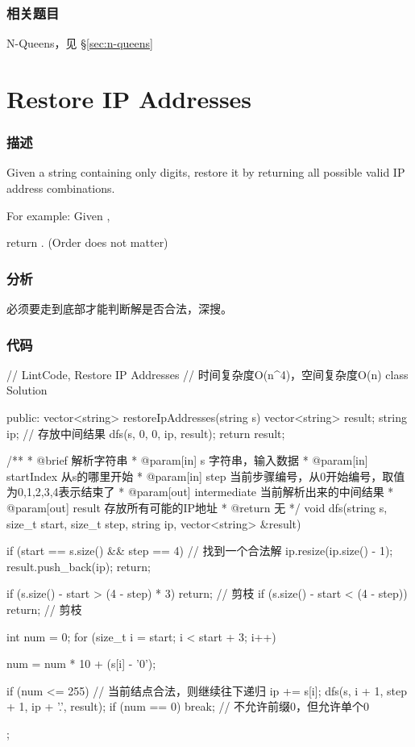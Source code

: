 \subsubsection{相关题目}
\begindot
\item N-Queens，见 \S \ref{sec:n-queens}
\myenddot


\section{Restore IP Addresses} %
\label{sec:restore-ip-addresses}


\subsubsection{描述}
Given a string containing only digits, restore it by returning all possible valid IP address combinations.

For example:
Given ,

return \code{["255.255.11.135", "255.255.111.35"]}. (Order does not matter)


\subsubsection{分析}
必须要走到底部才能判断解是否合法，深搜。


\subsubsection{代码}
\begin{Code}
// LintCode, Restore IP Addresses
// 时间复杂度O(n^4)，空间复杂度O(n)
class Solution {
public:
    vector<string> restoreIpAddresses(string s) {
        vector<string> result;
        string ip; // 存放中间结果
        dfs(s, 0, 0, ip, result);
        return result;
    }

    /**
     * @brief 解析字符串
     * @param[in] s 字符串，输入数据
     * @param[in] startIndex 从s的哪里开始
     * @param[in] step 当前步骤编号，从0开始编号，取值为0,1,2,3,4表示结束了
     * @param[out] intermediate 当前解析出来的中间结果
     * @param[out] result 存放所有可能的IP地址
     * @return 无
     */
    void dfs(string s, size_t start, size_t step, string ip,
            vector<string> &result) {
        if (start == s.size() && step == 4) {  // 找到一个合法解
            ip.resize(ip.size() - 1);
            result.push_back(ip);
            return;
        }

        if (s.size() - start > (4 - step) * 3)
            return;  // 剪枝
        if (s.size() - start < (4 - step))
            return;  // 剪枝

        int num = 0;
        for (size_t i = start; i < start + 3; i++) {
            num = num * 10 + (s[i] - '0');

            if (num <= 255) {  // 当前结点合法，则继续往下递归
                ip += s[i];
                dfs(s, i + 1, step + 1, ip + '.', result);
            }
            if (num == 0) break;  // 不允许前缀0，但允许单个0
        }
    }
};
\end{Code}


